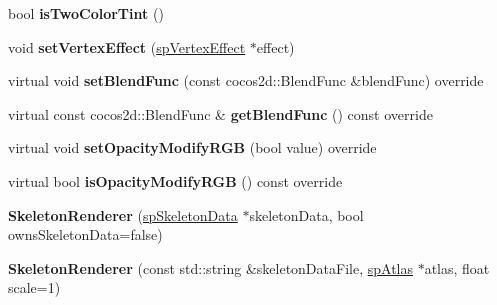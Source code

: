 \begin{DoxyCompactItemize}
\item 
\mbox{\label{classspine_1_1SkeletonRenderer_a37528b50367cdee560272072682f40e3}} 
bool {\bfseries is\+Two\+Color\+Tint} ()
\item 
\mbox{\label{classspine_1_1SkeletonRenderer_a467d7516a0e573b450bb944af169e11d}} 
void {\bfseries set\+Vertex\+Effect} (\hyperlink{structspVertexEffect}{sp\+Vertex\+Effect} $\ast$effect)
\item 
\mbox{\label{classspine_1_1SkeletonRenderer_a43f06f03ff35bd681f3a9b99b94421a7}} 
virtual void {\bfseries set\+Blend\+Func} (const cocos2d\+::\+Blend\+Func \&blend\+Func) override
\item 
\mbox{\label{classspine_1_1SkeletonRenderer_afa89723959cf4e711b3caac43baaf774}} 
virtual const cocos2d\+::\+Blend\+Func \& {\bfseries get\+Blend\+Func} () const override
\item 
\mbox{\label{classspine_1_1SkeletonRenderer_a7642ec2be84a8ff2036679b60a71e9c6}} 
virtual void {\bfseries set\+Opacity\+Modify\+R\+GB} (bool value) override
\item 
\mbox{\label{classspine_1_1SkeletonRenderer_a9f96f28b9f68eb6b29a9a2458a4dcd0b}} 
virtual bool {\bfseries is\+Opacity\+Modify\+R\+GB} () const override
\item 
\mbox{\label{classspine_1_1SkeletonRenderer_afbdbe972afcf555a49c850ee9c1274a1}} 
{\bfseries Skeleton\+Renderer} (\hyperlink{structspSkeletonData}{sp\+Skeleton\+Data} $\ast$skeleton\+Data, bool owns\+Skeleton\+Data=false)
\item 
\mbox{\label{classspine_1_1SkeletonRenderer_a1b0fc5fd436836d7d56e330f753e1b85}} 
{\bfseries Skeleton\+Renderer} (const std\+::string \&skeleton\+Data\+File, \hyperlink{structspAtlas}{sp\+Atlas} $\ast$atlas, float scale=1)
\item 
\mbox{\label{classspine_1_1SkeletonRenderer_a428be0adca6889f3dec2d4c0f04d12cf}} 

\end{DoxyCompactItemize}
